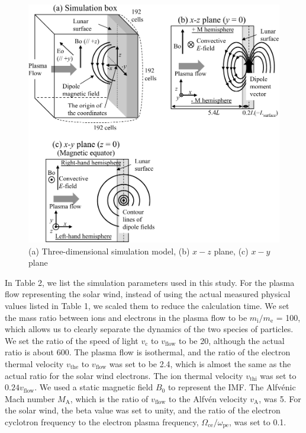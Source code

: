\documentclass[draft,jgrga]{agutex2015}
\begin{document}
\begin{article}
\begin{figure}[t]
 \centering
 \noindent\includegraphics[]{./figures/Fig_1_bb-crop.pdf}
 \caption{(a) Three-dimensional simulation model, (b) $x-z$ plane, (c) $x-y$ plane}\label{fig:1}
\end{figure}


In Table 2, 
we list the simulation parameters used in this study. 
For the plasma flow representing the solar wind, 
instead of using the actual measured physical values listed in Table 1, 
we scaled them to reduce the calculation time. 
We set the mass ratio between ions and electrons in the plasma flow 
to be $ m_\mathrm{i}/ m_\mathrm{e}$ = 100, which allows us 
to clearly separate the dynamics of the two species of particles. 
We set the ratio of the speed of light $v_\mathrm{c}$ to 
$v_\mathrm{flow}$ to be 20, 
although the actual ratio is about 600. 
The plasma flow is isothermal, and 
the ratio of the electron thermal velocity 
$v_\mathrm{the}$ to $v_\mathrm{flow}$ was set to be 2.4, 
which is almost the same as the actual ratio for the solar wind electrons. 
The ion thermal velocity $v_\mathrm{thi}$ was set to $0.24v_\mathrm{flow}$.
We used a static magnetic field $B_0$ to represent the IMF. 
The Alfv\'{e}nic Mach number $M_\mathrm{A}$, which is the ratio of $v_\mathrm{flow}$ to 
the Alfv\'{e}n velocity $v_\mathrm{A}$, was 5. 
For the solar wind, the beta value was set to unity, and the ratio of 
the electron cyclotron frequency to
the electron plasma frequency,
$\Omega_\mathrm{ce} / \omega_\mathrm{pe}$, 
was set to 0.1. 


\end{article}
\end{document}

